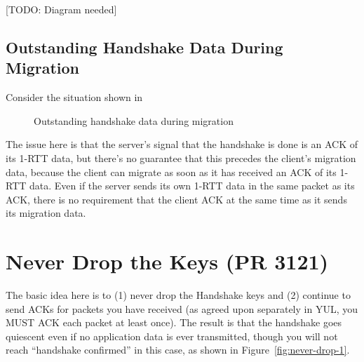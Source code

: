\documentclass{article}
\begin{document}
[TODO: Diagram needed]

\subsection{Outstanding Handshake Data During Migration}
\label{sec:outst-handsh-data}

Consider the situation shown in 
\begin{figure}[H]
\begin{center}
\end{center}
\caption{Outstanding handshake data during migration}
\label{fig:outstanding-handshake-migration}
\end{figure}

The issue here is that the server's signal that the handshake
is done is an ACK of its 1-RTT data, but there's no guarantee
that this precedes the client's migration data, because the
client can migrate as soon as it has received an ACK of its
1-RTT data. Even if the server sends its own 1-RTT data in
the same packet as its ACK, there is no requirement that
the client ACK at the same time as it sends its migration
data.


\section{Never Drop the Keys (PR 3121)}
\label{sec:never-drop-keys}

The basic idea here is to (1) never drop the Handshake keys
and (2) continue to send ACKs for packets you have received
(as agreed upon separately in YUL, you MUST ACK each
packet at least once). The result is that the handshake
goes quiescent even if no application data is ever transmitted,
though you will not reach ``handshake confirmed'' in this
case, as shown in Figure~\ref{fig:never-drop-1}.
\end{document}
